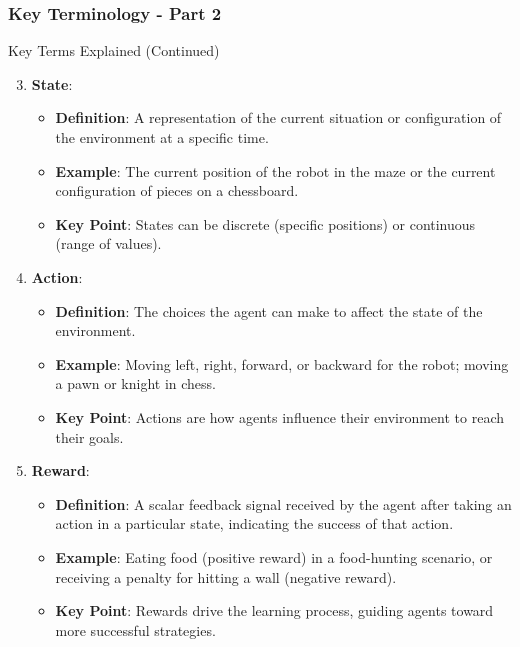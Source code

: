 \documentclass[aspectratio=169]{beamer}
\begin{document}
\begin{frame}[fragile]
    \frametitle{Key Terminology - Part 2}
    
    \begin{block}{Key Terms Explained (Continued)}
        \begin{enumerate}
            \setcounter{enumi}{2} %
            \item \textbf{State}:
                \begin{itemize}
                    \item \textbf{Definition}: A representation of the current situation or configuration of the environment at a specific time.
                    \item \textbf{Example}: The current position of the robot in the maze or the current configuration of pieces on a chessboard.
                    \item \textbf{Key Point}: States can be discrete (specific positions) or continuous (range of values).
                \end{itemize}
            \item \textbf{Action}:
                \begin{itemize}
                    \item \textbf{Definition}: The choices the agent can make to affect the state of the environment.
                    \item \textbf{Example}: Moving left, right, forward, or backward for the robot; moving a pawn or knight in chess.
                    \item \textbf{Key Point}: Actions are how agents influence their environment to reach their goals.
                \end{itemize}
            \item \textbf{Reward}:
                \begin{itemize}
                    \item \textbf{Definition}: A scalar feedback signal received by the agent after taking an action in a particular state, indicating the success of that action.
                    \item \textbf{Example}: Eating food (positive reward) in a food-hunting scenario, or receiving a penalty for hitting a wall (negative reward).
                    \item \textbf{Key Point}: Rewards drive the learning process, guiding agents toward more successful strategies.
                \end{itemize}
        \end{enumerate}
    \end{block}
\end{frame}
\end{document}
